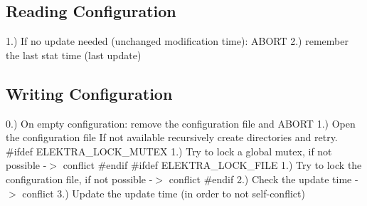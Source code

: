 \subsection*{Reading Configuration}

1.) If no update needed (unchanged modification time)\+: A\+B\+O\+R\+T 2.) remember the last stat time (last update)

\subsection*{Writing Configuration}

0.) On empty configuration\+: remove the configuration file and A\+B\+O\+R\+T 1.) Open the configuration file If not available recursively create directories and retry. \#ifdef E\+L\+E\+K\+T\+R\+A\+\_\+\+L\+O\+C\+K\+\_\+\+M\+U\+T\+E\+X 1.) Try to lock a global mutex, if not possible -\/$>$ conflict \#endif \#ifdef E\+L\+E\+K\+T\+R\+A\+\_\+\+L\+O\+C\+K\+\_\+\+F\+I\+L\+E 1.) Try to lock the configuration file, if not possible -\/$>$ conflict \#endif 2.) Check the update time -\/$>$ conflict 3.) Update the update time (in order to not self-\/conflict) 